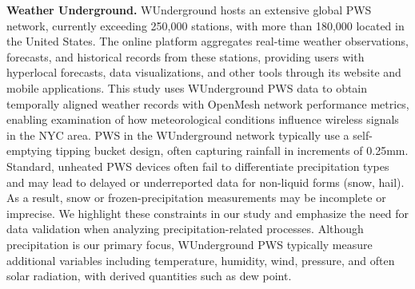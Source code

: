 \documentclass[manuscript]{copernicus}
\begin{document}
\noindent \textbf{Weather Underground.}
WUnderground \citep{wunderground} hosts an extensive global PWS network, currently exceeding 250{,}000 stations, with more than 180{,}000 located in the United States. The online platform aggregates real-time weather observations, forecasts, and historical records from these stations, providing users with hyperlocal forecasts, data visualizations, and other tools through its website and mobile applications.
This study uses WUnderground PWS data to obtain temporally aligned weather records with OpenMesh network performance metrics, enabling examination of how meteorological conditions influence wireless signals in the NYC area.
PWS in the WUnderground network typically use a self-emptying tipping bucket design, often capturing rainfall in increments of 0.25mm. Standard, unheated PWS devices often fail to differentiate precipitation types and may lead to delayed or underreported data for non-liquid forms (snow, hail). As a result, snow or frozen-precipitation measurements may be incomplete or imprecise. We highlight these constraints in our study and emphasize the need for data validation when analyzing precipitation-related processes.
Although precipitation is our primary focus, WUnderground PWS typically measure additional variables including temperature, humidity, wind, pressure, and often solar radiation, with derived quantities such as dew point. 








\end{document}
